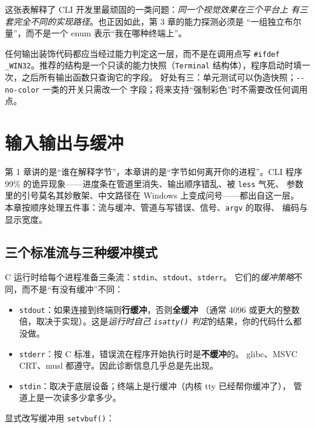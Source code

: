 \documentclass[12pt,a4paper,fontset=fandol]{ctexbook}
\newcommand{\Fn}[1]{\texttt{#1()}}
\newcommand{\Tp}[1]{\texttt{#1}}
\newcommand{\Opt}[1]{\texttt{-\/-#1}}
\begin{document}
这张表解释了 CLI 开发里最顽固的一类问题：\emph{同一个视觉效果在三个平台上
有三套完全不同的实现路径}。也正因如此，第 3 章的能力探测必须是
``一组独立布尔量''，而不是一个 enum 表示``我在哪种终端上''。

\begin{bestpractice}[title={先问``能不能''，再问``怎么写''}]
任何输出装饰代码都应当经过能力判定这一层，而不是在调用点写
\Tp{\#ifdef \_WIN32}。推荐的结构是一个只读的能力快照（\Tp{Terminal}
结构体），程序启动时填一次，之后所有输出函数只查询它的字段。
好处有三：单元测试可以伪造快照；\Opt{no-color} 一类的开关只需改一个
字段；将来支持``强制彩色''时不需要改任何调用点。
\end{bestpractice}

\chapter{输入输出与缓冲}

第 1 章讲的是``谁在解释字节''，本章讲的是``字节如何离开你的进程''。CLI 程序
99\% 的诡异现象——进度条在管道里消失、输出顺序错乱、被 \Tp{less} 气死、
参数里的引号莫名其妙散架、中文路径在 Windows 上变成问号——都出自这一层。
本章按顺序处理五件事：流与缓冲、管道与写错误、信号、\Tp{argv} 的取得、
编码与显示宽度。

\section{三个标准流与三种缓冲模式}

C 运行时给每个进程准备三条流：\Tp{stdin}、\Tp{stdout}、\Tp{stderr}。
它们的\emph{缓冲策略}不同，而不是``有没有缓冲''不同：

\begin{itemize}
\item \Tp{stdout}：如果连接到终端则\textbf{行缓冲}，否则\textbf{全缓冲}
      （通常 4096 或更大的整数倍，取决于实现）。这是\emph{运行时自己
      \Fn{isatty} 判定}的结果，你的代码什么都没做。
\item \Tp{stderr}：按 C 标准，错误流在程序开始执行时是\textbf{不缓冲}的。
      glibc、MSVC CRT、musl 都遵守。因此诊断信息几乎总是先出现。
\item \Tp{stdin}：取决于底层设备；终端上是行缓冲（内核 tty 已经帮你缓冲了），
      管道上是一次读多少拿多少。
\end{itemize}

显式改写缓冲用 \Fn{setvbuf}：
\end{document}
